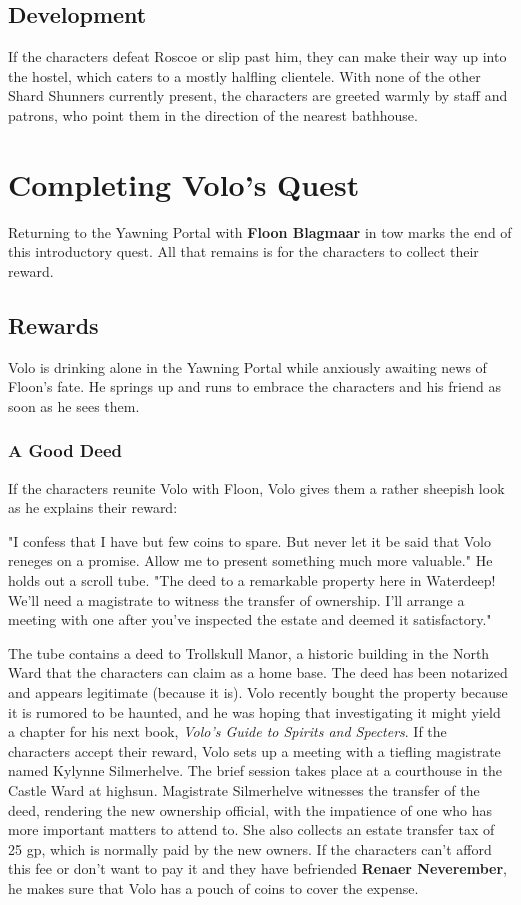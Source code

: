 \documentclass[10pt,a4paper,twoside,twocolumn,openany,nodeprecatedcode]{dndbook}
\begin{document}
\subsection{Development}
If the characters defeat Roscoe or slip past him, they can make their way up into the hostel, which caters to a mostly halfling clientele. With none of the other Shard Shunners currently present, the characters are greeted warmly by staff and patrons, who point them in the direction of the nearest bathhouse.
\section{Completing Volo's Quest}
Returning to the Yawning Portal with \textbf{Floon Blagmaar} in tow marks the end of this introductory quest. All that remains is for the characters to collect their reward.
\subsection{Rewards}
Volo is drinking alone in the Yawning Portal while anxiously awaiting news of Floon's fate. He springs up and runs to embrace the characters and his friend as soon as he sees them.
\subsubsection{A Good Deed}
If the characters reunite Volo with Floon, Volo gives them a rather sheepish look as he explains their reward:
\begin{DndReadAloud}{}
"I confess that I have but few coins to spare. But never let it be said that Volo reneges on a promise. Allow me to present something much more valuable." He holds out a scroll tube. "The deed to a remarkable property here in Waterdeep! We'll need a magistrate to witness the transfer of ownership. I'll arrange a meeting with one after you've inspected the estate and deemed it satisfactory."
\end{DndReadAloud}

The tube contains a deed to Trollskull Manor, a historic building in the North Ward that the characters can claim as a home base. The deed has been notarized and appears legitimate (because it is). Volo recently bought the property because it is rumored to be haunted, and he was hoping that investigating it might yield a chapter for his next book, \textit{Volo's Guide to Spirits and Specters}.
If the characters accept their reward, Volo sets up a meeting with a tiefling magistrate named Kylynne Silmerhelve. The brief session takes place at a courthouse in the Castle Ward at highsun. Magistrate Silmerhelve witnesses the transfer of the deed, rendering the new ownership official, with the impatience of one who has more important matters to attend to. She also collects an estate transfer tax of 25 gp, which is normally paid by the new owners. If the characters can't afford this fee or don't want to pay it and they have befriended \textbf{Renaer Neverember}, he makes sure that Volo has a pouch of coins to cover the expense.
\end{document}
